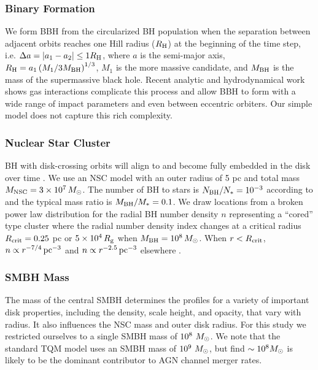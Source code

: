 \subsubsection{Binary Formation}
We form BBH from the circularized BH population when the separation between adjacent orbits reaches one Hill radius ($R_{\rm H}$) at the beginning of the time step, i.e. $\Delta a = |a_1-a_2| \leq 1R_{\rm H}$, where $a$ is the semi-major axis, $R_{\rm H} = a_1 \left( M_1/3M_{\rm BH} \right)^{1/3}$, $M_1$ is the more massive candidate, and $M_{\rm BH}$ is the mass of the supermassive black hole.
Recent analytic \citep{QianLiLai24, DodiciTremaine24} and hydrodynamical work \citep{DeLaurentiis+23, Whitehead+24} shows gas interactions complicate this process and allow BBH to form with a wide range of impact parameters and even between eccentric orbiters.
Our simple model does not capture this rich complexity.

\subsubsection{Nuclear Star Cluster}
BH with disk-crossing orbits will align to and become fully embedded in the disk over time \citep{Fabj+20,Nasim+22,McKernan+22-starfall,WangZhuLin24}.
We use an NSC model with an outer radius of 5 pc and total mass $M_{\rm NSC}=3 \times 10^7\,M_{\odot}$.
The number of BH to stars is $N_{\rm BH}/N_{*} = 10^{-3}$ according to \citet{Generozov+18} and the typical mass ratio is $M_{\rm BH}/M_{*} = 0.1$.
We draw locations from a broken power law distribution for the radial BH number density $n$ representing a ``cored'' type cluster where the radial number density index changes at a critical radius $R_{\rm crit}=0.25$ pc or $5\times10^4\,R_{\rm g}$ when $M_{\rm BH}=10^8\,M_{\odot}$.
When $r<R_{\rm crit}$, $n\propto r^{-7/4}\,{\rm pc}^{-3}$ and $n\propto r^{-2.5}\,{\rm pc}^{-3}$ elsewhere \citep{BachallWolf76,Generozov+18}.

\subsubsection{SMBH Mass}
\label{sec:smbh-mass}
The mass of the central SMBH determines the profiles for a variety of important disk properties, including the density, scale height, and opacity, that vary with radius.
It also influences the NSC mass and outer disk radius.
For this study we restricted ourselves to a single SMBH mass of $10^8~M_{\odot}$.
We note that the standard TQM model uses an SMBH mass of $10^9~M_{\odot}$, but \citet{Delfavero+25-mcfactsIII} find $\sim 10^{8}M_{\odot}$ is likely to be the dominant contributor to AGN channel merger rates.

